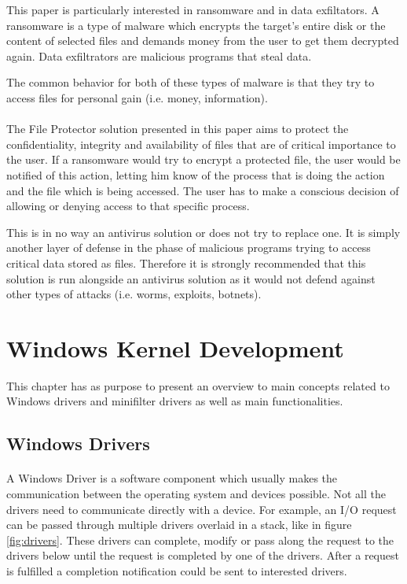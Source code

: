 	This paper is particularly interested in ransomware and in data exfiltators. A ransomware is a type of malware which encrypts the target’s entire disk or the content of selected files and demands money from the user to get them decrypted again\cite{AnIntroductionToMalware}. Data exfiltrators are malicious programs that steal data. 
	
	The common
behavior for both of these types of malware is that they try to access files for personal gain (i.e. money, information). 
	
	\paragraph{}
	The File Protector solution presented in this paper aims to protect the confidentiality, integrity and availability of files that are of critical importance to the user. If a ransomware would try to encrypt a protected file, the user would be notified of this action, letting him know of the process that is doing the action and the file which is being accessed. The user has to make a conscious decision of allowing or denying access to that specific process. 
	
	This is in no way an antivirus solution or does not try to replace one. It is simply another layer of defense in the phase of malicious programs trying to access critical data stored as files. Therefore it is strongly recommended that this solution is run alongside an antivirus solution as it would not defend against other types of attacks (i.e. worms, exploits, botnets).
	
	
	
	\newpage
	\section{Windows Kernel Development}
		This chapter has as purpose to present an overview to main concepts related to Windows drivers and minifilter drivers as well as main functionalities.
	
		\subsection{Windows Drivers}
		\paragraph{}
		A Windows Driver is a software component which usually makes the communication between the operating system and devices possible. Not all the drivers need to communicate directly with a device. For example, an I/O request can be passed through multiple drivers overlaid in a stack, like in figure \ref{fig:drivers}. These drivers can complete, modify or pass along the request to the drivers below until the request is completed by one of the drivers. After a request is fulfilled a completion notification could be sent to interested drivers\cite{MSDNWhatIsADriver}.
		
